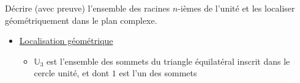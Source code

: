 \documentclass{article}
\renewenvironment{question_kholle}[2][ ]
{
	\subsection{\texorpdfstring{#2}{}}
	\notblank{#1}
	{
		\noindent #1
		\bigbreak
	}
	{}
	\begin{proof}
}
{
	\end{proof}
}
\begin{document}
\begin{question_kholle}{Décrire (avec preuve) l'ensemble des racines $n$-ièmes de l'unité et les localiser géométriquement dans le plan complexe.}
\begin{itemize}
\begin{align*}
\begin{array}{ll}
				              \theta \equiv 0 \left[ \frac{2\pi}{n} \right] \\
				              z = \rho e^{i \theta}                         \\
				              (\rho, \theta) \in \mathbb{R}_{+}^{*}\times \mathbb{R}
			              \end{array}\right.
			      \\ & \iff
			      \left\{ \begin{array}{ll}
				              \rho = 1                                            \\
				              \exists k \in \mathbb{Z} : \theta = \frac{2k\pi}{n} \\
				              z = \rho e^{i \theta}                               \\
				              (\rho, \theta) \in \mathbb{R}_{+}^{*}\times \mathbb{R}
			              \end{array}\right.
			      \\  & \iff \exists k \in \mathbb{Z}: z=e^{\frac{2ik\pi}{n}} \\
			       & \iff z \in \left\{ e^{\frac{2ik\pi}{n}}\mid k \in \mathbb{Z} \right\}
		      \end{align*}


		      L'ensemble des solutions est paramétré par l'entier $k$ qui parcourt un ensemble infini. Toutefois, en représentant graphiquement les solutions, il semblerait que "tous les $n$", on fait un tour de cercle trigonométrique de plus, en redécrivant les solutions déjà obtenues pour $k \in [ \! [ 0, n-1 ] \!]$.
		\item \underline{Localisation géométrique}
		      \begin{itemize}[label=$\star$]
			      \item $\mathbb U _3$ est l'ensemble des sommets du triangle équilatéral inscrit dans le cercle unité, et dont $1$ est l'un des sommets


\end{itemize}
\end{itemize}
\end{question_kholle}
\end{document}
